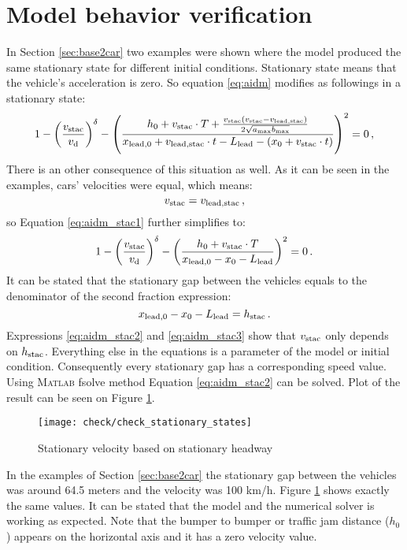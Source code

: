 	\section{Model behavior verification}
		In Section \ref{sec:base2car} two examples were shown where the model produced the same stationary state for different initial conditions. Stationary state means that the vehicle's acceleration is zero. So equation \ref{eq:aidm} modifies as followings in a stationary state:
		\begin{equation}
		1 - \left ( \frac{v_{\rm stac}}{v_{\rm d}} \right )^{\rm \delta} - \left ( \frac{h_0+v_{\rm stac}\cdot T+\frac{v_{\rm stac}(v_{\rm stac}-v_{\rm lead,stac})}{2\sqrt{a_{\rm max} b_{\rm max}}}}{x_{\rm lead,0}+v_{\rm lead, stac}\cdot t - L_{\rm lead} - (x_{0} + v_{\rm stac}\cdot t)} \right )^2=0\,,
		\label{eq:aidm_stac1}
		\end{equation}
		There is an other consequence of this situation as well. As it can be seen in the examples, cars' velocities were equal, which means:
		\begin{equation}
			v_{\rm stac}=v_{\rm lead,stac}\,,
		\end{equation}
		so Equation \ref{eq:aidm_stac1} further simplifies to:
		\begin{equation}
			1 - \left ( \frac{v_{\rm stac}}{v_{\rm d}} \right )^{\rm \delta} - \left ( \frac{h_0+v_{\rm stac}\cdot T}{x_{\rm lead,0}-x_{0} - L_{\rm lead}} \right )^2=0\,.
			\label{eq:aidm_stac2}
		\end{equation}
		It can be stated that the stationary gap between the vehicles equals to the denominator of the second fraction expression:
		\begin{equation}
		x_{\rm lead,0}-x_{0} - L_{\rm lead}=h_{\rm stac}\,.
		\label{eq:aidm_stac3}
		\end{equation}
		Expressions \ref{eq:aidm_stac2} and \ref{eq:aidm_stac3} show that $v_{\rm stac}$ only depends on $h_{\rm stac}$. Everything else in the equations is a parameter of the model or initial condition. Consequently every stationary gap has a corresponding speed value. Using \textsc{Matlab} fsolve method Equation \ref{eq:aidm_stac2} can be solved. Plot of the result can be seen on Figure \ref{fig:aidm_stac}.
		\begin{figure}[ht]
			\centering
			\texttt{[image: check/check\_stationary\_states]}
			\caption{Stationary velocity based on stationary headway}
			\label{fig:aidm_stac}
		\end{figure}

		In the examples of Section \ref{sec:base2car} the stationary gap between the vehicles was around 64.5 meters and the velocity was 100 km/h. Figure \ref{fig:aidm_stac} shows exactly the same values. It can be stated that the model and the numerical solver is working as expected. Note that the bumper to bumper or traffic jam distance ($h_0$) appears on the horizontal axis and it has a zero velocity value.
